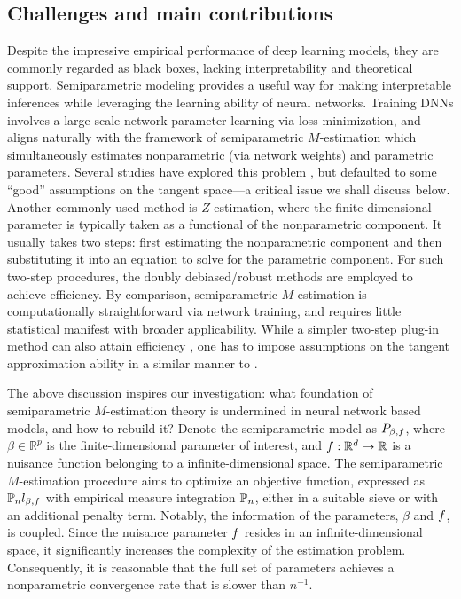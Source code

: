 \subsection{Challenges and main contributions}\label{sec:chacon}
Despite the impressive empirical performance of deep learning models, they are commonly regarded as black boxes, lacking interpretability and theoretical support. Semiparametric modeling provides a useful way for making interpretable inferences while leveraging the learning ability of neural networks. 
Training DNNs involves a large-scale network parameter learning via loss minimization, and aligns naturally with the framework of semiparametric $M$-estimation which simultaneously estimates nonparametric (via network weights) and parametric parameters. 
Several studies have explored this problem \citep[e.g.,][]{deepcox},  but defaulted to some ``good'' assumptions on the tangent space—a critical issue we shall discuss below. 
Another commonly used method is $Z$-estimation, where the finite-dimensional parameter is typically taken as a functional of the nonparametric component. 
It usually takes two steps: first estimating the nonparametric component and then substituting it into an equation to solve for the parametric component. 
For such two-step procedures, the doubly debiased/robust methods \citep{chernozhukov2018double,farrell2021deep} are employed to achieve efficiency. By comparison, semiparametric $M$-estimation is computationally straightforward via network training, and requires little statistical manifest with broader applicability. While a simpler two-step plug-in method can also attain efficiency \citep{chen2024causal}, one has to impose assumptions on the tangent approximation ability in a similar manner to \citet{deepcox}. 



The above discussion inspires our investigation: what foundation of semiparametric $M$-estimation theory is undermined in neural network based models, and how to rebuild it? 
Denote the semiparametric model as $P_{\beta, f }$, where \( \beta \in \mathbb{R}^p \) is the finite-dimensional parameter of interest, and \( f : \mathbb{R}^d \to \mathbb{R} \) is a nuisance function belonging to a infinite-dimensional space.
The semiparametric $M$-estimation procedure aims to optimize an objective function, expressed as $\mathbb{P}_{n} l_{\beta, f}$ with empirical measure integration $\mathbb{P}_{n}$, either in a suitable sieve or with an additional penalty term. Notably, the information of the parameters, \( \beta \) and \( f \), is coupled. 
Since the nuisance parameter \(f\) resides in an infinite-dimensional space, it significantly increases the complexity of the estimation problem. Consequently, it is reasonable that the full set of parameters achieves a nonparametric convergence rate that is slower than $n^{-1}$. 


